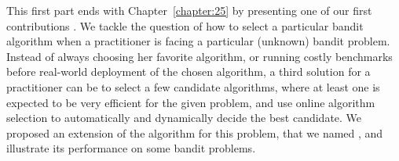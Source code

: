 %
This first part ends with Chapter~\ref{chapter:25} by presenting one of our first contributions \cite{Besson2018WCNC}.
We tackle the question of how to select a particular bandit algorithm when a practitioner is facing a particular (unknown) bandit problem.
Instead of always choosing her favorite algorithm, or running costly benchmarks before real-world deployment of the chosen algorithm, a third solution for a practitioner can be to select a few candidate algorithms, where at least one is expected to be very efficient for the given problem, and use online algorithm selection to automatically and dynamically decide the best candidate.
We proposed an extension of the \ExpFour{} algorithm for this problem, that we named \Aggr, and illustrate its performance on some bandit problems.



